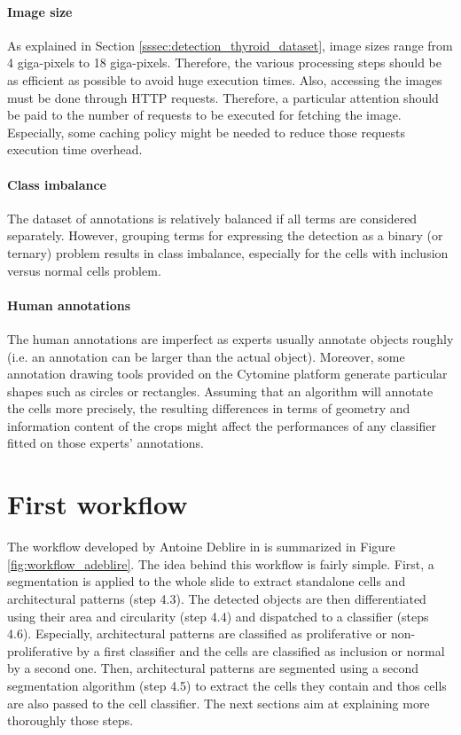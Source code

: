 \paragraph{Image size} As explained in Section \ref{sssec:detection_thyroid_dataset}, image sizes range from 4 giga-pixels to 18 giga-pixels. Therefore, the various processing steps should be as efficient as possible to avoid huge execution times. Also, accessing the images must be done through HTTP requests. Therefore, a particular attention should be paid to the number of requests to be executed for fetching the image. Especially, some caching policy might be needed to reduce those requests execution time overhead. 

\paragraph{Class imbalance} The dataset of annotations is relatively balanced if all terms are considered separately. However, grouping terms for expressing the detection as a binary (or ternary) problem results in class imbalance, especially for the cells with inclusion versus normal cells problem. 

\paragraph{Human annotations} The human annotations are imperfect as experts usually annotate objects roughly (i.e. an annotation can be larger than the actual object). Moreover, some annotation drawing tools provided on the Cytomine platform generate particular shapes such as circles or rectangles. Assuming that an algorithm will annotate the cells more precisely, the resulting  differences in terms of geometry and information content of the crops might affect the performances of any classifier fitted on those experts' annotations. 

\section{First workflow}
\label{sec:thyroid_adeblire_algo}

The workflow developed by Antoine Deblire in \cite{adeblire2013} is summarized in Figure \ref{fig:workflow_adeblire}. The idea behind this workflow is fairly simple. First, a segmentation is applied to the whole slide to extract standalone cells and architectural patterns (step 4.3). The detected objects are then differentiated using their area and circularity (step 4.4) and dispatched to a classifier (steps 4.6). Especially, architectural patterns are classified as proliferative or non-proliferative by a first classifier and the cells are classified as inclusion or normal by a second one. Then, architectural patterns are segmented using a second segmentation algorithm (step 4.5) to extract the cells they contain and thos cells are also passed to the cell classifier. The next sections aim at explaining more thoroughly those steps.

